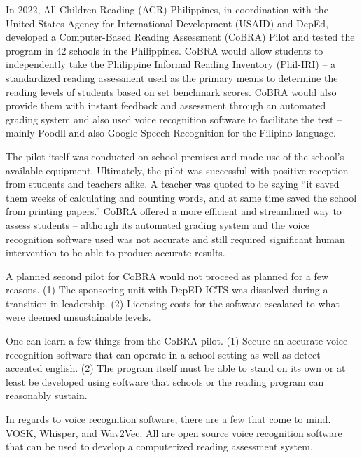 In 2022, All Children Reading (ACR) Philippines, in coordination with the United States Agency for International Development (USAID) and DepEd, developed a Computer-Based Reading Assessment (CoBRA) Pilot and tested the program in 42 schools in the Philippines. CoBRA would allow students to independently take the Philippine Informal Reading Inventory (Phil-IRI) – a standardized reading assessment used as the primary means to determine the reading levels of students based on set benchmark scores. CoBRA would also provide them with instant feedback and assessment through an automated grading system and also used voice recognition software to facilitate the test – mainly Poodll and also Google Speech Recognition for the Filipino language. \nocite{UnitedStatesAgencyforInternationalDevelopment_2022}

The pilot itself was conducted on school premises and made use of the school’s available equipment. Ultimately, the pilot was successful with positive reception from students and teachers alike. A teacher was quoted to be saying “it saved them weeks of calculating and counting words, and at same time saved the school from printing papers.” CoBRA offered a more efficient and streamlined way to assess students – although its automated grading system and the voice recognition software used was not accurate and still required significant human intervention to be able to produce accurate results.

A planned second pilot for CoBRA would not proceed as planned for a few reasons. (1) The sponsoring unit with DepED ICTS was dissolved during a transition in leadership. (2) Licensing costs for the software escalated to what were deemed unsustainable levels.

One can learn a few things from the CoBRA pilot. (1) Secure an accurate voice recognition software that can operate in a school setting as well as detect accented english. (2) The program itself must be able to stand on its own or at least be developed using software that schools or the reading program can reasonably sustain.

In regards to voice recognition software, there are a few that come to mind. VOSK, Whisper, and Wav2Vec. All are open source voice recognition software that can be used to develop a computerized reading assessment system.













